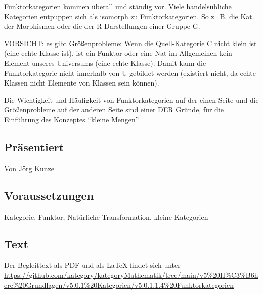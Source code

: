 \documentclass[a4paper]{amsart}
\theoremstyle{definition}
\newcommand{\zb}{z.~B. }
\begin{document}
Funktorkategorien kommen überall und ständig vor. Viele handelsübliche Kategorien entpuppen sich als isomorph zu Funktorkategorien. So \zb die Kat. der Morphismen oder die der R-Darstellungen einer Gruppe G.

VORSICHT: es gibt Größenprobleme: Wenn die Quell-Kategorie C nicht klein ist (eine echte Klasse ist), ist ein Funktor oder eine Nat im Allgemeinen kein Element unseres Universums (eine echte Klasse). Damit kann die Funktorkategorie nicht innerhalb von U gebildet werden (existiert nicht, da echte Klassen nicht Elemente von Klassen sein können).

Die Wichtigkeit und Häufigkeit von Funktorkategorien auf der einen Seite und die Größenprobleme auf der anderen Seite sind einer DER Gründe, für die Einführung des Konzeptes "`kleine Mengen"'. 

\subsection*{Präsentiert}
Von Jörg Kunze

\subsection*{Voraussetzungen}
Kategorie, Funktor, Natürliche Transformation, kleine Kategorien

\subsection*{Text}
Der Begleittext als PDF und als LaTeX findet sich unter
{\tiny
   \url{https://github.com/kategory/kategoryMathematik/tree/main/v5%20H%C3%B6here%20Grundlagen/v5.0.1%20Kategorien/v5.0.1.1.4%20Funktorkategorien}
}

\end{document}
